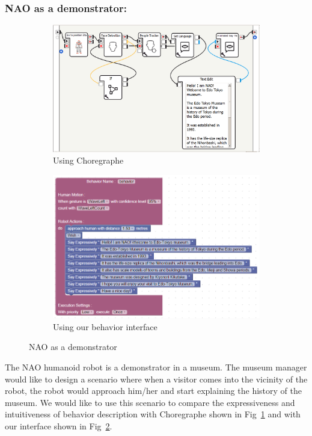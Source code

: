 \documentclass{llncs}
\begin{document}
\subsubsection{NAO as a demonstrator: }
\begin{figure}
\centering
\begin{subfigure}[t]{0.49\textwidth}
\includegraphics[width=\textwidth]{../thesis/assets/scenario_museum_choregraphe2.png}
\caption[NAO as demonstrator]{Using Choregraphe}
\label{fig:scenario1_program_choregraphe}
\end{subfigure}
\begin{subfigure}[t]{0.49\textwidth}
\includegraphics[width=\textwidth]{../thesis/assets/scenario1.png}
\caption[NAO as therapy facilitator]{Using our behavior interface}
\label{fig:scenario1_program}
\end{subfigure}
\caption[NAO as a demonstrator]{NAO as a demonstrator}
\label{fig:scenarios}
\end{figure}
	The NAO humanoid robot is a demonstrator in a museum. The museum manager would like to design a scenario where when a visitor comes into the vicinity of the robot, the robot would approach him/her and start explaining the history of the museum. We would like to use this scenario to compare the expressiveness and intuitiveness of behavior description with Choregraphe \cite{NaoRobot} shown in Fig~\ref{fig:scenario1_program_choregraphe} and with our interface shown in Fig~\ref{fig:scenario1_program}.
	
\end{document}
